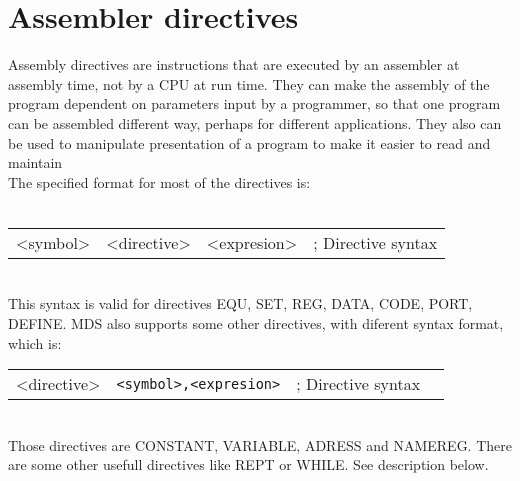         \section{Assembler directives}
        Assembly directives are instructions
        that are executed by an assembler at assembly time,
        not by a CPU at run time. They can make the assembly of the program
        dependent on parameters input by a programmer, so that one program can be
        assembled different way, perhaps for different applications. They also
        can be used to manipulate presentation of a program to make it easier to read and maintain\\
        The specified format for most of the directives is:
                 \\
                 \\ {
                \texttt{}
                \begin{tabular}[h!]{llll}
                { \color{highlight_symbol} <symbol> }  &
                    { \color{highlight_directive} <directive> } &
                    { \color{highlight_constant} <expresion> } & { \color{highlight_comment} ; Directive syntax }\\
                \end{tabular}
                 }
                 \\
        This syntax is valid for directives EQU, SET, REG, DATA, CODE, PORT, DEFINE.
        MDS also supports some other directives, with diferent syntax format, which is:
         \\      {
                \texttt{}
                \begin{tabular}[h!]{llll}
                        { \color{highlight_directive} <directive> } &
                        { \color{highlight_constant}\verb`<symbol>,<expresion>`  } & { \color{highlight_comment} ; Directive syntax }\\
                \end{tabular}
                 }
           \\
        Those directives are CONSTANT, VARIABLE, ADRESS and NAMEREG. There are some other usefull directives like REPT or WHILE. See description below.

